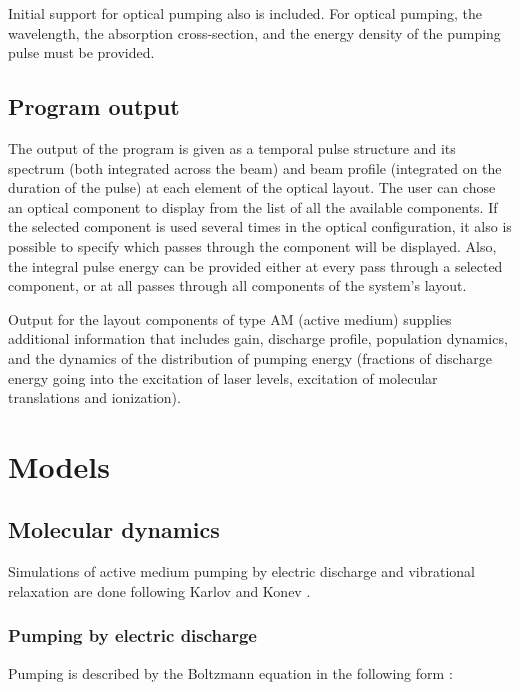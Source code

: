 \documentclass{report}
\begin{document}
Initial support for optical pumping also is included. For optical pumping, the wavelength, the absorption cross-section, and the energy density of the pumping pulse must be provided.



\section{Program output}
The output of the program is given as a temporal pulse structure and its spectrum (both integrated across the beam) and beam profile (integrated on the duration of the pulse) at each element of the optical layout. The user can chose an optical component to display from the list of all the available components. If the selected component is used several times in the optical configuration, it also is possible to specify which passes through the component will be displayed. Also, the integral pulse energy can be provided either at every pass through a selected component, or at all passes through all components of the system’s layout.

Output for the layout components of type AM (active medium) supplies  additional information that includes gain, discharge profile, population dynamics, and the dynamics of the distribution of pumping energy  (fractions of discharge energy going into the excitation of laser levels, excitation of molecular translations and ionization).


\chapter{Models}

\section{Molecular dynamics}
Simulations of active medium pumping by electric discharge and vibrational relaxation are done following Karlov and Konev  \cite{Karlov-1978}.

\subsection{Pumping by electric discharge}
Pumping is described by the Boltzmann equation in the following form \cite{Holstein-1946,Nighan-1970}:
\end{document}
